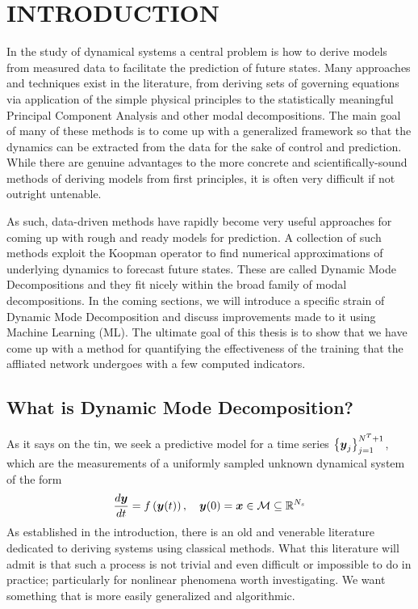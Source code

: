 
\chapter{INTRODUCTION}
\label{chap:intro}

In the study of dynamical systems a central problem is how to derive models 
from measured data to facilitate the prediction of future states. Many 
approaches and techniques exist in the literature, from deriving sets of 
governing equations via application of the simple physical principles to 
the statistically meaningful Principal Component Analysis and other modal 
decompositions. The main goal of many of these methods is to come up with 
a generalized framework so that the dynamics can be extracted from the data
for the sake of control and prediction. While there are genuine advantages
to the more concrete and scientifically-sound methods of deriving models 
from first principles, it is often very difficult if not outright untenable.

As such, data-driven methods have rapidly become very useful approaches for 
coming up with rough and ready models for prediction. A collection of such
methods exploit the Koopman operator to find numerical approximations of 
underlying dynamics to forecast future states. These are called Dynamic Mode 
Decompositions and they fit nicely within the broad family of modal 
decompositions. In the coming sections, we will introduce a specific strain
of Dynamic Mode Decomposition and discuss improvements made to it using
Machine Learning (ML). The ultimate goal of this thesis is to show that we have
come up with a method for quantifying the effectiveness of the training 
that the affliated network undergoes with a few computed indicators.


\section{What is Dynamic Mode Decomposition?}
As it says on the tin, we seek a predictive model for a time series 
$\left\{\boldsymbol{y}_j\right\}_{j=1}^{N^T+1}$, which are the measurements of a 
uniformly sampled unknown dynamical system of the form
\begin{equation}
    \frac{d\boldsymbol{y}}{dt} = f\left(\boldsymbol{y}(t)\right),\quad \boldsymbol{y}(0) 
    = \boldsymbol{x} \in \mathcal{M} \subseteq \mathbb{R}^{N_s}
\end{equation}
As established in the introduction, there is an old and venerable literature 
dedicated to deriving systems using classical methods. What this literature will 
admit is that such a process is not trivial and even difficult or impossible to 
do in practice; particularly for nonlinear phenomena worth investigating. We 
want something that is more easily generalized and algorithmic.

